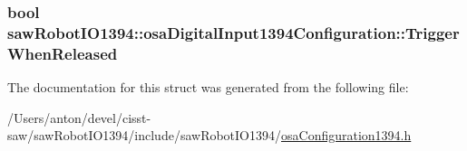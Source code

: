 \subsubsection[{Trigger\+When\+Released}]{\setlength{\rightskip}{0pt plus 5cm}bool saw\+Robot\+I\+O1394\+::osa\+Digital\+Input1394\+Configuration\+::\+Trigger\+When\+Released}\label{structsaw_robot_i_o1394_1_1osa_digital_input1394_configuration_a8422056c0ee6a2e53ecced0d79efe1b8}


The documentation for this struct was generated from the following file\+:\begin{DoxyCompactItemize}
\item 
/\+Users/anton/devel/cisst-\/saw/saw\+Robot\+I\+O1394/include/saw\+Robot\+I\+O1394/\hyperlink{osa_configuration1394_8h}{osa\+Configuration1394.\+h}\end{DoxyCompactItemize}
